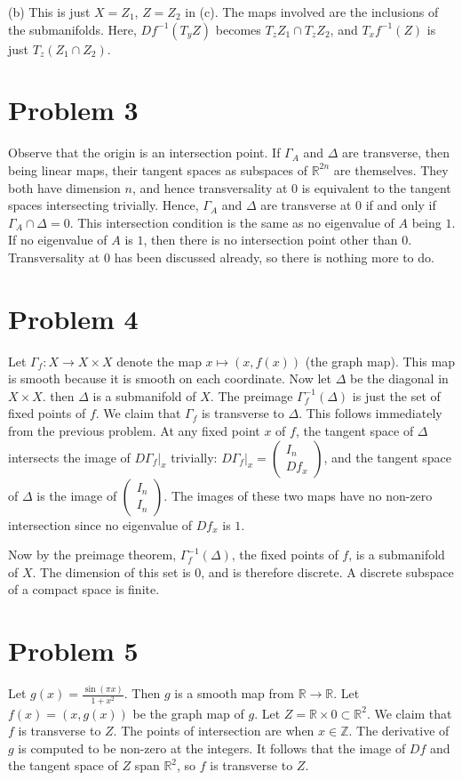 \documentclass{amsart}
\numberwithin{equation}{section}
\theoremstyle{plain}
\theoremstyle{definition}
\theoremstyle{remark}
\newcommand{\Z}{\mathbb{Z}}
\renewcommand{\_}[2]{\underbrace{#1}_{#2}}
\renewcommand{\^}[2]{\overbrace{#1}_{#2}}
\newcommand{\R}{\mathbb{R}}
\begin{document}
 (b) This is just $X = Z_1$, $Z = Z_2$ in (c). The maps involved are the inclusions of the submanifolds. Here, $Df^{-1}(T_yZ)$ becomes $T_zZ_1 \cap T_zZ_2$, and $T_xf^{-1}(Z)$ is just $T_z(Z_1\cap Z_2)$. 
\section*{Problem 3}
Observe that the origin is an intersection point. If $\Gamma_A$ and $\Delta$ are transverse, then being linear maps, their tangent spaces as subspaces of $\R^{2n}$ are themselves. They both have dimension $n$, and hence transversality at $0$ is equivalent to the tangent spaces intersecting trivially. Hence, $\Gamma_A$ and $\Delta$ are transverse at $0$ if and only if $\Gamma_A \cap \Delta = 0$. This intersection condition is the same as no eigenvalue of $A$ being $1$. If no eigenvalue of $A$ is $1$, then there is no intersection point other than $0$. Transversality at $0$ has been discussed already, so there is nothing more to do.

\section*{Problem 4}
Let $\Gamma_f: X\to X\times X$ denote the map $x\mapsto (x,f(x))$ (the graph map). This map is smooth because it is smooth on each coordinate. Now let $\Delta$ be the diagonal in $X\times X$. then $\Delta$ is a submanifold of $X$. The preimage $\Gamma_f^{-1}(\Delta)$ is just the set of fixed points of $f$. We claim that $\Gamma_f$ is transverse to $\Delta$. This follows immediately from the previous problem. At any fixed point $x$ of $f$, the tangent space of $\Delta$ intersects the image of $D\Gamma_f|_x$ trivially: $D\Gamma_f|_x =
\begin{pmatrix}
  I_n\\
  Df_x
\end{pmatrix}$, and the tangent space of $\Delta$ is the image of $
\begin{pmatrix}
  I_n\\
  I_n
\end{pmatrix}$. The images of these two maps have no non-zero intersection since no eigenvalue of $Df_x$ is $1$.

Now by the preimage theorem, $\Gamma_f^{-1}(\Delta)$, the fixed points of $f$, is a submanifold of $X$. The dimension of this set is $0$, and is therefore discrete. A discrete subspace of a compact space is finite.

\section*{Problem 5}
Let $g(x) = \frac{\sin(\pi x)}{1+x^2}$. Then $g$ is a smooth map from $\R\to \R$. Let $f(x) = (x,g(x))$ be the graph map of $g$. Let $Z = \R\times 0 \subset \R^2$. We claim that $f$ is transverse to $Z$. The points of intersection are when $x \in \Z$. The derivative of $g$ is computed to be non-zero at the integers. It follows that the image of $Df$ and the tangent space of $Z$ span $\R^2$, so $f$ is transverse to $Z$.
\end{document}
